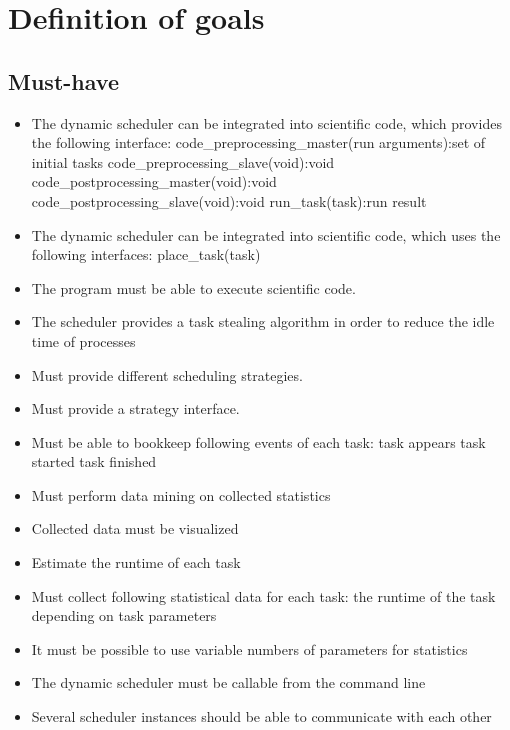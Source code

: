 \section{Definition of goals}
	\subsection{Must-have}
		\begin{itemize}
			\item The dynamic scheduler can be integrated into scientific code, which provides the following interface:
				\subitem code\_preprocessing\_master(run arguments):set of initial tasks
				\subitem code\_preprocessing\_slave(void):void
				\subitem code\_postprocessing\_master(void):void
				\subitem code\_postprocessing\_slave(void):void
				\subitem run\_task(task):run result
			\item The dynamic scheduler can be integrated into scientific code, which uses the following interfaces:
				\subitem place\_task(task)
				
			\item The program must be able to execute scientific code.%
			\item The scheduler provides a task stealing algorithm in order to reduce the idle time of processes%
			\item Must provide different scheduling strategies.
			\item Must provide a strategy interface.
			\item Must be able to bookkeep following events of each task:
				\subitem task appears
				\subitem task started
				\subitem task finished
			\item Must perform data mining on collected statistics
			\item Collected data must be visualized
			\item Estimate the runtime of each task
			\item Must collect following statistical data for each task:
				\subitem the runtime of the task depending on task parameters
			\item It must be possible to use variable numbers of parameters for statistics
			\item The dynamic scheduler must be callable from the command line
			\item Several scheduler instances should be able to communicate with each other
		\end{itemize}
